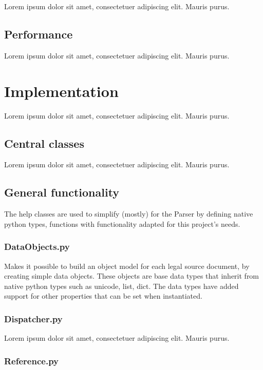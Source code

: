 \documentclass[a4paper,11pt]{kth-mag}
\begin{document}
Lorem ipsum dolor sit amet, consectetuer adipiscing elit. Mauris
purus.  

\section{Performance}

Lorem ipsum dolor sit amet, consectetuer adipiscing elit. Mauris
purus. 

\chapter{Implementation}

Lorem ipsum dolor sit amet, consectetuer adipiscing elit. Mauris
purus. 

\section{Central classes}

Lorem ipsum dolor sit amet, consectetuer adipiscing elit. Mauris
purus. 

\section{General functionality}

The help classes are used to simplify (mostly) for the Parser by defining native python types, functions with functionality adapted for this project's needs.  

\subsection{DataObjects.py}

Makes it possible to build an object model for each legal source document, by
creating simple data objects. These objects are base data types that inherit
from native python types such as unicode, list, dict. The data types have
added support for other properties that can be set when instantiated.

\subsection{Dispatcher.py}

Lorem ipsum dolor sit amet, consectetuer adipiscing elit. Mauris
purus. 

\subsection{Reference.py}
\end{document}
